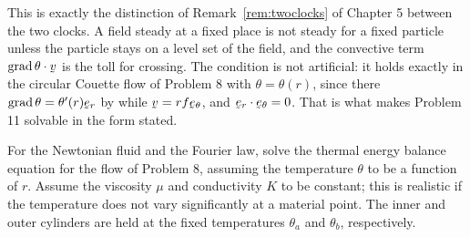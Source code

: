 \begin{solution}
This is exactly the distinction of Remark~\ref{rem:twoclocks} of
Chapter 5 between the two clocks. A field steady at a fixed place
is not steady for a fixed particle unless the particle stays on a
level set of the field, and the convective term $\ip{\grad\theta}\bv$ is
the toll for crossing. The condition is not artificial: it holds exactly
in the circular Couette flow of Problem 8 with $\theta=\theta(r)$, since
there $\grad\theta=\theta'(r)\ber$ by  while
$\bv=rf\bet$, and $\ip{\ber}{\bet}=0$. That is what makes Problem 11
solvable in the form stated.
\end{solution}

\begin{problem}
For the Newtonian fluid and the Fourier law, solve the thermal energy
balance equation for the flow of Problem 8, assuming the temperature
$\theta$ to be a function of $r$. Assume the viscosity $\mu$ and
conductivity $K$ to be constant; this is realistic if the temperature
does not vary significantly at a material point. The inner and outer
cylinders are held at the fixed temperatures $\theta_{a}$ and
$\theta_{b}$, respectively.
\end{problem}

